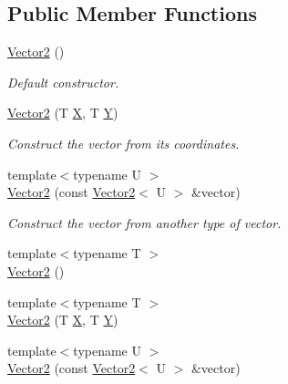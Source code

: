 \subsection*{Public Member Functions}
\begin{DoxyCompactItemize}
\item 
\hyperlink{classsf_1_1_vector2_a58c32383b5291380db4b43a289f75988}{Vector2} ()
\begin{DoxyCompactList}\small\item\em Default constructor. \end{DoxyCompactList}\item 
\hyperlink{classsf_1_1_vector2_aed26a72164e59e8a4a0aeee2049568f1}{Vector2} (T \hyperlink{glsmapint_8h_adf764cbdea00d65edcd07bb9953ad2b7a58833a3110c570fb05130d40c365d1e4}{X}, T \hyperlink{glsmapint_8h_adf764cbdea00d65edcd07bb9953ad2b7a5596231eabd6cf29050967d5ac83ad84}{Y})
\begin{DoxyCompactList}\small\item\em Construct the vector from its coordinates. \end{DoxyCompactList}\item 
{\footnotesize template$<$typename U $>$ }\\\hyperlink{classsf_1_1_vector2_a3da455e0ae3f8ff6d2fe36d10b332d10}{Vector2} (const \hyperlink{classsf_1_1_vector2}{Vector2}$<$ U $>$ \&vector)
\begin{DoxyCompactList}\small\item\em Construct the vector from another type of vector. \end{DoxyCompactList}\item 
{\footnotesize template$<$typename T $>$ }\\\hyperlink{classsf_1_1_vector2_a39e5056d930011fba562ad69679efcb8}{Vector2} ()
\item 
{\footnotesize template$<$typename T $>$ }\\\hyperlink{classsf_1_1_vector2_a18a61144d6839c5658b62ebb49c9eb68}{Vector2} (T \hyperlink{glsmapint_8h_adf764cbdea00d65edcd07bb9953ad2b7a58833a3110c570fb05130d40c365d1e4}{X}, T \hyperlink{glsmapint_8h_adf764cbdea00d65edcd07bb9953ad2b7a5596231eabd6cf29050967d5ac83ad84}{Y})
\item 
{\footnotesize template$<$typename U $>$ }\\\hyperlink{classsf_1_1_vector2_a3da455e0ae3f8ff6d2fe36d10b332d10}{Vector2} (const \hyperlink{classsf_1_1_vector2}{Vector2}$<$ U $>$ \&vector)
\end{DoxyCompactItemize}
